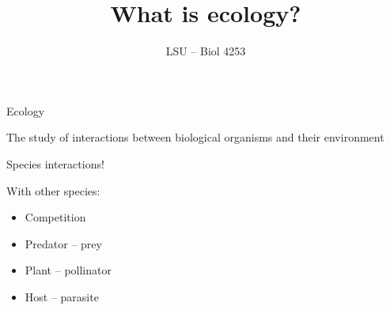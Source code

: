 \documentclass[12pt]{beamer}
\title{\Large What is ecology?}
\author{LSU -- Biol 4253}
\date{}
\begin{document}
\maketitle



























\begin{frame}

	\begin{flushright}
	  \Large \textcolor{boss2}{Ecology} 
	\end{flushright}

The study of interactions between biological organisms and their environment


\end{frame}







\begin{frame}

	\begin{flushright}
	  {\Large \textcolor{boss2}{Species interactions!}}
	\end{flushright}

  With other species:

  \begin{itemize}
    \item Competition
    \item Predator -- prey
    \item Plant -- pollinator
    \item Host -- parasite
  \end{itemize}  

\end{frame}
\end{document}
